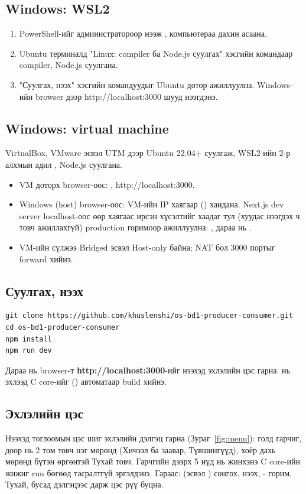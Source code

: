 \documentclass[12pt,a4paper]{article}
\newcommand{\key}[1]{\fbox{\footnotesize\ttfamily #1}}
\begin{document}
\subsection{Windows: WSL2}
\begin{enumerate}
  \item PowerShell-ийг администратороор нээж , компьютераа дахин асаана.
  \item Ubuntu терминалд "Linux: compiler ба Node.js суулгах" хэсгийн командаар compiler, Node.js суулгана.
  \item "Суулгах, нээх" хэсгийн командуудыг Ubuntu дотор ажиллуулна. Windows-ийн browser дээр http://localhost:3000 шууд нээгдэнэ.
\end{enumerate}

\subsection{Windows: virtual machine}
VirtualBox, VMware эсвэл UTM дээр Ubuntu 22.04+ суулгаж, WSL2-ийн 2-р алхмын адил , Node.js суулгана.
\begin{itemize}
  \item VM доторх browser-оос: , http://localhost:3000.
  \item Windows (host) browser-оос: VM-ийн IP хаягаар () хандана. Next.js dev server localhost-оос өөр хаягаас ирсэн хүсэлтийг хаадаг тул (хуудас нээгдэх ч товч ажиллахгүй) production горимоор ажиллуулна: , дараа нь .
  \item VM-ийн сүлжээ Bridged эсвэл Host-only байна; NAT бол 3000 портыг forward хийнэ.
\end{itemize}

\subsection{Суулгах, нээх}
\begin{lstlisting}[style=shell]
git clone https://github.com/khuslenshi/os-bd1-producer-consumer.git
cd os-bd1-producer-consumer
npm install
npm run dev
\end{lstlisting}
Дараа нь browser-т \textbf{http://localhost:3000}-ийг нээхэд эхлэлийн цэс гарна.  нь эхлээд C core-ийг () автоматаар build хийнэ.

\subsection{Эхлэлийн цэс}
Нээхэд тоглоомын цэс шиг эхлэлийн дэлгэц гарна (Зураг~\ref{fig:menu}): голд гарчиг, доор нь 2 том товч нэг мөрөнд (Хичээл ба заавар, Түвшингүүд), хоёр дахь мөрөнд бүтэн өргөнтэй Тухай товч. Гарчгийн дээрх 5 нүд нь жинхэнэ C core-ийн жижиг run бөгөөд тасралтгүй эргэлдэнэ. Гараас: \key{←} \key{→} (эсвэл \key{↑} \key{↓}) сонгох, \key{Enter} нээх, \key{1}-\key{2} горим, \key{3} Тухай, бусад дэлгэцээс \key{Esc} дарж цэс рүү буцна.
\end{document}
